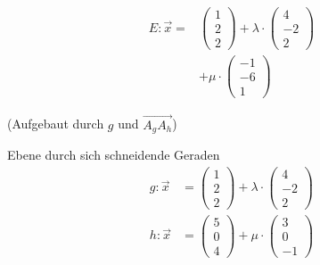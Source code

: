 \documentclass[paper=a6,ngerman,twoside=true,fontsize=14pt, parskip = half]{scrartcl}
\begin{document}
\begin{antwort}
	
	\begin{align*}
	E:\vec{x}=&\left(\begin{array}{c} 1 \\ 2 \\ 2\end{array} \right)+\lambda \cdot \left(\begin{array}{c} 4 \\ -2 \\ 2\end{array} \right)\\
	&+\mu \cdot \left(\begin{array}{c} -1 \\-6 \\ 1\end{array} \right)
	\end{align*}
	\begin{center}
	(Aufgebaut durch $g$ und $\vec{A_gA_h}$)
	\end{center}
	
\end{antwort}	
\begin{frage}
	Ebene durch sich schneidende Geraden
	\begin{align*}
	g:\vec{x}&=\left(\begin{array}{c} 1 \\ 2 \\ 2\end{array} \right)+\lambda \cdot \left(\begin{array}{c} 4 \\ -2 \\ 2\end{array} \right)\\
	h:\vec{x}&=\left(\begin{array}{c} 5 \\ 0 \\ 4\end{array} \right)+\mu \cdot \left(\begin{array}{c} 3 \\ 0 \\ -1\end{array} \right)
	\end{align*}
\end{frage}
\end{document}
